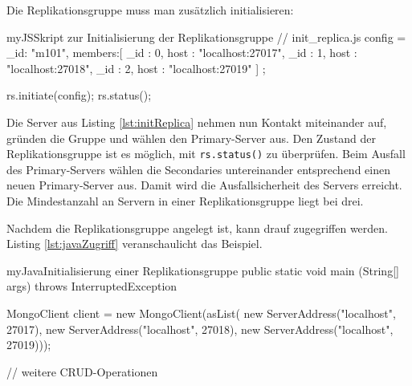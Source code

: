 Die Replikationsgruppe muss man zusätzlich initialisieren:

\begin{listingsboxJavaScript}[label={lst:initReplica}]{myJS}{Skript zur Initialisierung der Replikationsgruppe}
// init_replica.js
config = { _id: "m101", members:[
          { _id : 0, host : "localhost:27017"},
          { _id : 1, host : "localhost:27018"},
          { _id : 2, host : "localhost:27019"} ]
};

rs.initiate(config);
rs.status();
\end{listingsboxJavaScript}


Die Server aus Listing \ref{lst:initReplica} nehmen nun Kontakt miteinander auf, gründen die Gruppe und wählen den Primary-Server aus. Den Zustand der Replikationsgruppe ist es möglich, mit \texttt{rs.status()} zu überprüfen. Beim Ausfall des Primary-Servers wählen die Secondaries untereinander entsprechend einen neuen Primary-Server aus. Damit wird die Ausfallsicherheit des Servers erreicht. Die Mindestanzahl an Servern in einer Replikationsgruppe liegt bei drei. 

Nachdem die Replikationsgruppe angelegt ist, kann drauf zugegriffen werden. Listing \ref{lst:javaZugriff} veranschaulicht das Beispiel.

\begin{listingsboxJava}[label={lst:javaZugriff}]{myJava}{Initialisierung einer Replikationsgruppe}
public static void main (String[] args) throws InterruptedException {
        MongoClient client = new MongoClient(asList(
                new ServerAddress("localhost", 27017),
                new ServerAddress("localhost", 27018),
                new ServerAddress("localhost", 27019)));
                
                // weitere CRUD-Operationen
}
\end{listingsboxJava}

%
%

